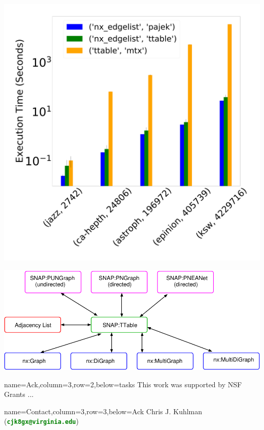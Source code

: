 \documentclass[landscape,paperwidth=70in,paperheight=46in,fontscale=0.225]{baposter} %
\begin{document}
\begin{poster}
{\begin{minipage}{0.45\linewidth}
\includegraphics[scale=0.038]{figures/scatter_bar_to_ttable.pdf}
\end{minipage}
\begin{center}
\includegraphics[scale=0.5]{figures/star_trans.pdf}
\end{center}

}

          {name=Ack,column=3,row=2,below=tasks}{
{\footnotesize
This work was supported by NSF
Grants ...
}
}

          {name=Contact,column=3,row=3,below=Ack}{
{\footnotesize
{Chris J. Kuhlman~ (\textcolor{green}{\textbf{\texttt{cjk8gx@virginia.edu}}})}
}}

\end{poster}
\end{document}

